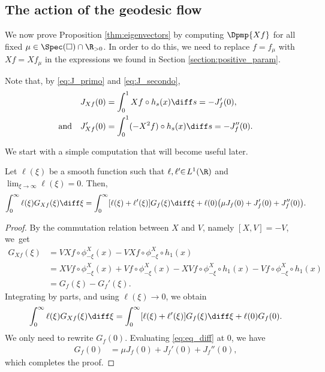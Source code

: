 \subsection{The action of the geodesic flow}\label{section:geo_action}

We now prove Proposition \ref{thm:eigenvectors} by computing $\Dpmp{Xf}$ for all fixed $\mu \in \Spec(\square) \cap \R_{>0}$.
In order to do this, we need to replace $f=f_\mu$ with $Xf= Xf_\mu$ in the expressions we found in Section \ref{section:positive_param}.

Note that, by \eqref{eq:J_primo} and \eqref{eq:J_secondo},
\begin{equation}\label{eq:JX}
\begin{split}
&J_{Xf}(0) = \int_0^1 Xf \circ h_s(x) \diff s = -J_f'(0),\\
\text{and}\quad &J_{Xf}'(0)= \int_0^1 (-X^2f) \circ h_s(x) \diff s =- J_f''(0).
\end{split}
\end{equation}

We start with a simple computation that will become useful later.
\begin{lemma}\label{lemma:aGx}
Let $\ell(\xi)$ be a smooth function such that $\ell, \ell' \!\!\in\! L^1(\R)$ and \hbox{$\lim_{\xi \to \infty}\!\ell(\xi)\!=\!0$}. Then,
\[
\int_0^\infty \ell(\xi) G_{Xf}(\xi) \diff \xi = \int_0^\infty [\ell(\xi)+\ell'(\xi)] G_f(\xi) \diff \xi + \ell(0)\bigl(\mu J_f(0) + J_f'(0) + J_f''(0) \bigr).
\]
\end{lemma}
\begin{proof}
By the commutation relation between $X$ and $V$, namely $[X,V]=-V$, we~get
\begin{equation*}
\begin{split}
G_{Xf}(\xi) &= VXf \circ \phi^X_{-\xi}(x) - VXf \circ \phi^X_{-\xi} \circ h_1(x) \\
&= XVf \circ \phi^X_{-\xi}(x) +Vf \circ \phi^X_{-\xi}(x) - XVf \circ \phi^X_{-\xi} \circ h_1(x) -Vf \circ \phi^X_{-\xi} \circ h_1(x) \\
&= G_f(\xi) - G_f'(\xi).
\end{split}
\end{equation*}
Integrating by parts, and using $\ell(\xi) \to 0$, we obtain
\[
\int_0^\infty \ell(\xi) G_{Xf}(\xi) \diff \xi = \int_0^\infty [\ell(\xi)+\ell'(\xi)] G_f(\xi) \diff \xi + \ell(0)G_f(0).
\]
We only need to rewrite $G_f(0)$. Evaluating \eqref{eq:eq_diff} at $0$, we have
\begin{equation*}
\begin{split}
G_f(0) &=\mu J_f(0) + J_f'(0) + J_f''(0),
\end{split}
\end{equation*}
which completes the proof.
\end{proof}

